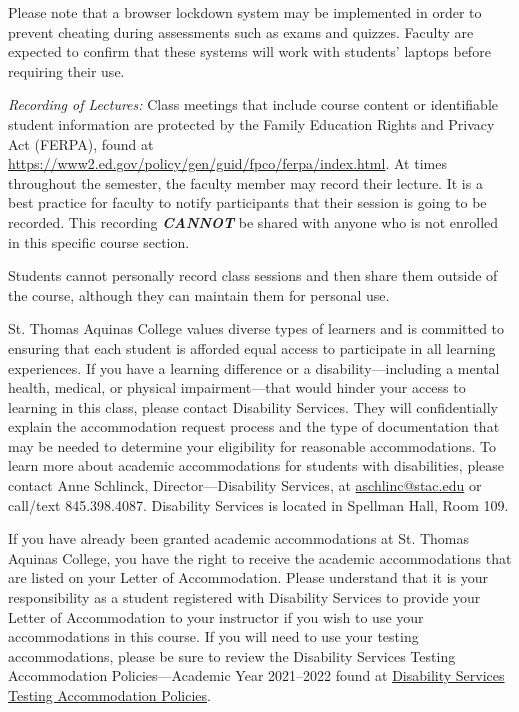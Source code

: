 \documentclass[11pt,letterpaper]{article}
\begin{document}
Please note that a browser lockdown system may be implemented in order to prevent cheating during assessments such as exams and quizzes. Faculty are expected to confirm that these systems will work with students' laptops before requiring their use. \pspace

{\itshape Recording of Lectures:} Class meetings that include course content or identifiable student information are protected by the Family Education Rights and Privacy Act (FERPA), found at \url{https://www2.ed.gov/policy/gen/guid/fpco/ferpa/index.html}. At times throughout the semester, the faculty member may record their lecture. It is a best practice for faculty to notify participants that their session is going to be recorded. This recording \textit{\bfseries CANNOT} be shared with anyone who is not enrolled in this specific course section. \pspace

Students cannot personally record class sessions and then share them outside of the course, although they can maintain them for personal use. 
\sectionbreak




St. Thomas Aquinas College values diverse types of learners and is committed to ensuring that each student is afforded equal access to participate in all learning experiences. If you have a learning difference or a disability---including a mental health, medical, or physical impairment---that would hinder your access to learning in this class, please contact Disability Services. They will confidentially explain the accommodation request process and the type of documentation that may be needed to determine your eligibility for reasonable accommodations. To learn more about academic accommodations for students with disabilities, please contact Anne Schlinck, Director---Disability Services, at \href{mailto:aschlinc@stac.edu}{aschlinc@stac.edu} or call/text 845.398.4087. Disability Services is located in Spellman Hall, Room 109. \pspace

If you have already been granted academic accommodations at St. Thomas Aquinas College, you have the right to receive the academic accommodations that are listed on your Letter of Accommodation.  Please understand that it is your responsibility as a student registered with Disability Services to provide your Letter of Accommodation to your instructor if you wish to use your accommodations in this course. If you will need to use your testing accommodations, please be sure to review the Disability Services Testing Accommodation Policies---Academic Year  2021--2022 found at \href{https://docs.google.com/document/d/1V5iUtgypiS8kClqhSLPde7AOSZPoLu6CsIDcpiEic2w/edit?usp=sharing}{Disability Services Testing Accommodation Policies}.
\sectionbreak
\end{document}
